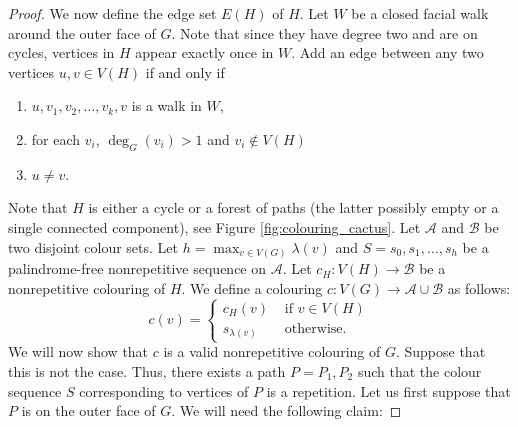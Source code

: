 \documentclass{patmorin}
\begin{document}
\begin{proof}
 
 We now define the edge set $E(H)$ of $H$. Let $W$ be a closed facial walk around the outer face of $G$. Note that since they have degree two and are on cycles, vertices in $H$ appear exactly once in $W$. Add an edge between any two vertices $u,v \in V(H)$ if and only if 
 \begin{enumerate}
  \item $u,v_1,v_2,\ldots,v_k,v$ is a walk in $W$,
  \item for each $v_i$, $\deg_G(v_i) > 1$ and $v_i \notin V(H)$
  \item $u\not=v$.
 \end{enumerate}
 Note that $H$ is either a cycle or a forest of paths (the latter possibly empty or a single connected component), see Figure \ref{fig:colouring_cactus}. Let $\mathcal{A}$ and $\mathcal{B}$ be two disjoint colour sets. Let $h=\max_{v \in V(G)} \lambda(v)$ and $S=s_0,s_1,\ldots,s_h$ be a palindrome-free nonrepetitive sequence on $\mathcal{A}$. Let $c_H : V(H) \rightarrow \mathcal{B}$ be a nonrepetitive colouring of $H$. We define a colouring $c : V(G) \rightarrow \mathcal{A} \cup \mathcal{B}$ as follows:
 \begin{equation}
  c(v) = \begin{cases}
          c_H(v) & \text{ if } v \in V(H)\\
          s_{\lambda(v)} & \text{ otherwise.}
         \end{cases}
 \end{equation}
 We will now show that $c$ is a valid nonrepetitive colouring of $G$. Suppose that this is not the case. Thus, there exists a path $P=P_1,P_2$ such that the colour sequence $S$ corresponding to vertices of $P$ is a repetition. Let us first suppose that $P$ is on the outer face of $G$. We will need the following claim:
 

\end{proof}
\end{document}

